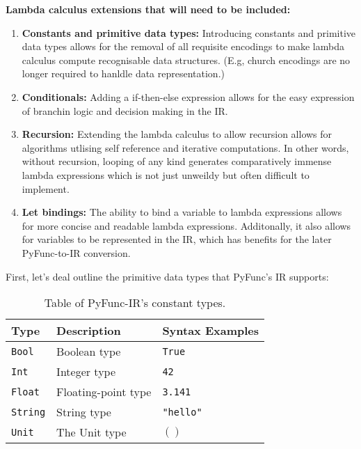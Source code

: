 \documentclass{l4proj}
\begin{document}
\textbf{Lambda calculus extensions that will need to be included:}
\begin{enumerate}
    \item \textbf{Constants and primitive data types:} Introducing constants and primitive data types allows for the removal of all requisite encodings to make lambda calculus compute recognisable data structures. (E.g, church encodings are no longer required to hanldle data representation.)
    \item \textbf{Conditionals:} Adding a if-then-else expression allows for the easy expression of branchin logic and decision making in the IR.
    \item \textbf{Recursion:} Extending the lambda calculus to allow recursion allows for algorithms utlising self reference and iterative computations.
    In other words, without recursion, looping of any kind generates comparatively immense lambda expressions which is not just unweildy but often difficult to implement.
    \item \textbf{Let bindings:} The ability to bind a variable to lambda expressions allows for more concise and readable lambda expressions.
    Additonally, it also allows for variables to be represented in the IR, which has benefits for the later PyFunc-to-IR conversion. 
\end{enumerate}

First, let's deal outline the primitive data types that PyFunc's IR supports:

\begin{table}[h]
\caption{Table of PyFunc-IR's constant types.}
\begin{center}
\begin{tabular}{@{}|l|l|l|@{}}
    \hline
    \textbf{Type}        & \textbf{Description}      & \textbf{Syntax Examples}  \\
    \hline
    \texttt{Bool}        & Boolean type              & \texttt{True}       \\
    \texttt{Int}         & Integer type              & \texttt{42}         \\
    \texttt{Float}       & Floating-point type       & \texttt{3.141}      \\
    \texttt{String}      & String type               & \texttt{"hello"}    \\
    \texttt{Unit}        & The Unit type             & \texttt{$()$}       \\ 
    \hline
\end{tabular}
\end{center}
\end{table}
\end{document}
